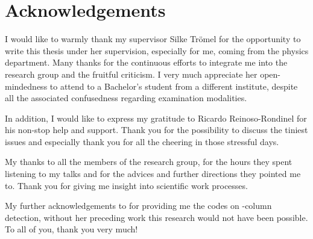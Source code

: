 \chapter*{Acknowledgements}
\label{sec:ack}

I would like to warmly thank my supervisor Silke Trömel for the opportunity to write this thesis under her supervision, especially for me, coming from the physics department.
Many thanks for the continuous efforts to integrate me into the research group and the fruitful criticism. I very much appreciate her open-mindedness to attend to a Bachelor's student from a different institute, despite all the associated confusedness regarding examination modalities.

In addition, I would like to express my gratitude to Ricardo Reinoso-Rondinel for his non-stop help and support. Thank you for the possibility to discuss the tiniest issues and especially thank you for all the cheering in those stressful days.

My thanks to all the members of the research group, for the hours they spent listening to my talks and for the advices and further directions they pointed me to. Thank you for giving me insight into scientific work processes.

My further acknowledgements to \citeauthor{mari} for providing me the codes on \zdr-column detection, without her preceding work this research would not have been possible. \\
To all of you, thank you very much!



